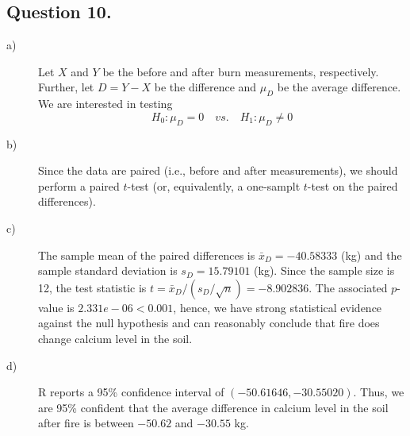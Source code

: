 \documentclass{article}\usepackage[]{graphicx}\usepackage[]{color}
\begin{document}


\subsection*{Question 10.}
  
\begin{description}

  \item[a)] Let $X$ and $Y$ be the before and after burn measurements, respectively. Further, let $D = Y - X$ be the difference and $\mu_D$ be the average difference. We are interested in testing
  \begin{equation*}
    H_0: \mu_D = 0 \quad vs. \quad H_1: \mu_D \ne 0
  \end{equation*}
  
  \item[b)] Since the data are paired (i.e., before and after measurements), we should perform a paired $t$-test (or, equivalently, a one-samplt $t$-test on the paired differences).
  
  \item[c)] The sample mean of the paired differences is $\bar{x}_D = -40.58333$ (kg) and the sample standard deviation is $s_D = 15.79101$ (kg). Since the sample size is 12, the test statistic is $t = \bar{x}_D / \left(s_D / \sqrt{n}\right) = -8.902836$. The associated $p$-value is $2.331e-06 < 0.001$, hence, we have strong statistical evidence against the null hypothesis and can reasonably conclude that fire does change calcium level in the soil.
  
  \item[d)] R reports a 95\% confidence interval of $\left(-50.61646, -30.55020\right)$. Thus, we are 95\% confident that the average difference in calcium level in the soil after fire is between $-50.62$ and $-30.55$ kg.
  
\end{description}
\end{document}
